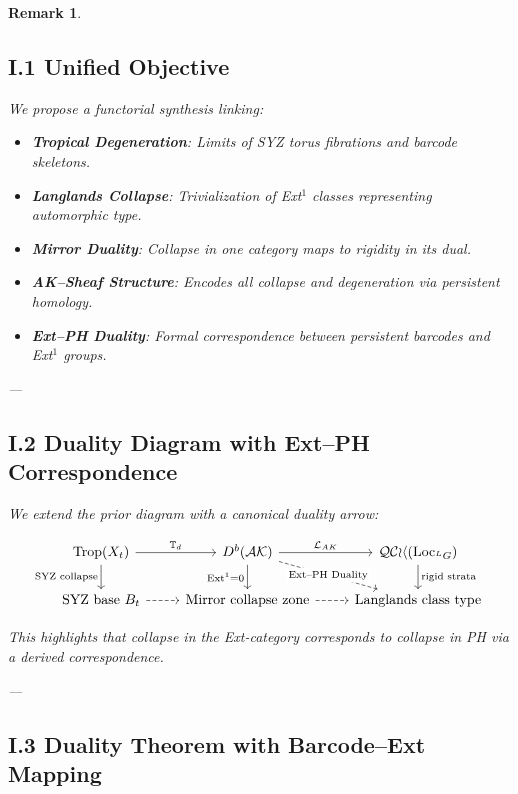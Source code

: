 \documentclass[11pt]{article}
\newtheorem{remark}[theorem]{Remark}
\begin{document}
\begin{remark}
\subsection*{I.1 Unified Objective}

We propose a functorial synthesis linking:

\begin{itemize}
  \item \textbf{Tropical Degeneration}: Limits of SYZ torus fibrations and barcode skeletons.
  \item \textbf{Langlands Collapse}: Trivialization of Ext$^1$ classes representing automorphic type.
  \item \textbf{Mirror Duality}: Collapse in one category maps to rigidity in its dual.
  \item \textbf{AK–Sheaf Structure}: Encodes all collapse and degeneration via persistent homology.
  \item \textbf{Ext–PH Duality}: Formal correspondence between persistent barcodes and Ext${}^1$ groups.
\end{itemize}

---

\subsection*{I.2 Duality Diagram with Ext–PH Correspondence}

We extend the prior diagram with a canonical duality arrow:

\[
\begin{tikzcd}
\mathrm{Trop}(X_t) \arrow[r, "\mathbb{T}_d"] \arrow[d, "\text{SYZ collapse}"'] &
D^b(\mathcal{AK}) \arrow[r, "\mathcal{L}_{AK}"] \arrow[d, "\mathrm{Ext}^1 = 0"'] \arrow[dr, dashed, "\text{Ext--PH Duality}" description] &
\mathcal{QCoh}(\mathrm{Loc}_{^LG}) \arrow[d, "\text{rigid strata}"] \\
\text{SYZ base } B_t \arrow[r, dashed] &
\text{Mirror collapse zone} \arrow[r, dashed] &
\text{Langlands class type}
\end{tikzcd}
\]

This highlights that collapse in the Ext-category corresponds to collapse in PH via a derived correspondence.

---

\subsection*{I.3 Duality Theorem with Barcode–Ext Mapping}


\end{remark}
\end{document}
